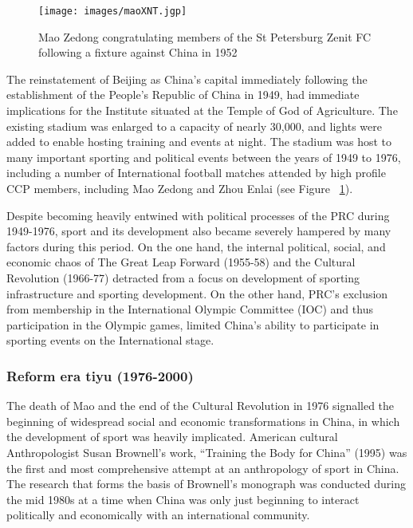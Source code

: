 {\begin{figure}[htbp]
  \texttt{[image: images/maoXNT.jgp]}
  \caption{Mao Zedong congratulating members of the St Petersburg Zenit FC following a fixture against China in 1952}
  \label{fig:maoXNT}
\end{figure}

The reinstatement of Beijing as China's capital immediately following the establishment of the People's Republic of China in 1949, had immediate implications for the Institute situated at the Temple of God of Agriculture.  The existing stadium was enlarged to a capacity of nearly 30,000, and lights were added to enable hosting training and events at night.  The stadium was host to many important sporting and political events between the years of 1949 to 1976, including a number of International football matches attended by high profile CCP members, including Mao Zedong and Zhou Enlai (see Figure ~\ref{fig:maoXNT}).

Despite becoming heavily entwined with political processes of the PRC during 1949-1976, sport and its development also became severely hampered by many factors during this period.  On the one hand, the internal political, social, and economic chaos of The Great Leap Forward (1955-58) and the Cultural Revolution (1966-77) detracted from a focus on development of sporting infrastructure and sporting development.  On the other hand, PRC's exclusion from membership in the International Olympic Committee (IOC) and thus participation in the Olympic games, limited China's ability to participate in sporting events on the International stage.






\subsubsection{Reform era tiyu (1976-2000)}
The death of Mao and the end of the Cultural Revolution in 1976 signalled the beginning of widespread social and economic transformations in China, in which the development of sport was heavily implicated.  American cultural Anthropologist Susan Brownell’s work, ``Training the Body for China'' (1995) was the first and most comprehensive attempt at an anthropology of sport in China. The research that forms the basis of Brownell's monograph was conducted during the mid 1980s at a time when China was only just beginning to interact politically and economically with an international community.

}
